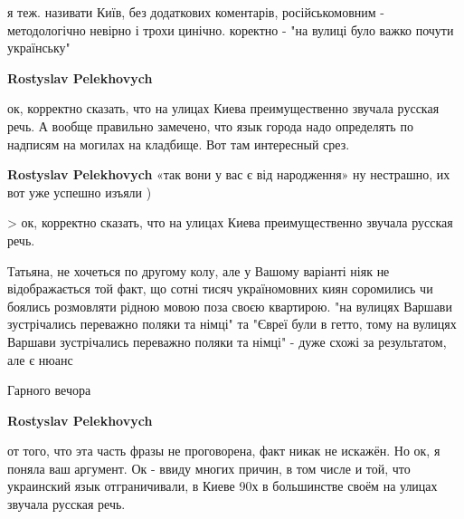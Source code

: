 \begin{itemize}
\begin{itemize}
я теж. називати Київ, без додаткових коментарів, російськомовним -
методологічно невірно і трохи цинічно. коректно - "на вулиці було важко почути
українську"


 
\textbf{Rostyslav Pelekhovych} 

ок, корректно сказать, что на улицах Киева преимущественно звучала русская
речь. А вообще правильно замечено, что язык города надо определять по надписям
на могилах на кладбище. Вот там интересный срез.


 
\textbf{Rostyslav Pelekhovych} «так вони у вас є від народження» ну нестрашно, их вот уже успешно изъяли )

 

> ок, корректно сказать, что на улицах Киева преимущественно звучала русская речь.

Татьяна, не хочеться по другому колу, але у Вашому варіанті ніяк не
відображається той факт, що сотні тисяч україномовних киян соромились чи
боялись розмовляти рідною мовою поза своєю квартирою. "на вулицях Варшави
зустрічались переважно поляки та німці" та "Євреї були в гетто, тому на вулицях
Варшави зустрічались переважно поляки та німці" - дуже схожі за результатом,
але є нюанс

Гарного вечора


 
\textbf{Rostyslav Pelekhovych} 

от того, что эта часть фразы не проговорена, факт никак не искажён. Но ок, я
поняла ваш аргумент. Ок - ввиду многих причин, в том числе и той, что
украинский язык отграничивали, в Киеве 90х в большинстве своём на улицах
звучала русская речь. 


\end{itemize}
\end{itemize}
